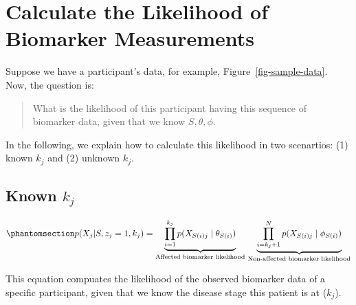 \documentclass[
  letterpaper,
  DIV=11,
  numbers=noendperiod]{scrreprt}
\begin{document}

\chapter{Calculate the Likelihood of Biomarker
Measurements}\label{sec-calc-ll}

Suppose we have a participant's data, for example,
Figure~\ref{fig-sample-data}. Now, the question is:

\begin{quote}
What is the likelihood of this participant having this sequence of
biomarker data, given that we know \(S, \theta, \phi\).
\end{quote}

In the following, we explain how to calculate this likelihood in two
scenartios: (1) known \(k_j\) and (2) unknown \(k_j\).

\section{\texorpdfstring{Known \(k_j\)}{Known k\_j}}\label{known-k_j}

\begin{equation}\phantomsection\label{eq-known-kj}{
p(X_{j} | S, z_j = 1, k_j) = \underbrace{\prod_{i=1}^{k_j}{p(X_{S(i)j} \mid \theta_{S(i)} )}}_{\text{Affected biomarker likelihood}} \, 
\underbrace{\prod_{i=k_j+1}^N{p(X_{S(i)j} \mid \phi_{S(i)})}}_{\text{Non-affected biomarker likelihood}}
}\end{equation}

This equation compuates the likelihood of the observed biomarker data of
a specific participant, given that we know the disease stage this
patient is at (\(k_j\)).
\end{document}
